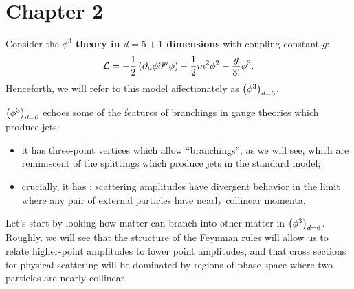 \section*{Chapter 2}

\begingroup
\renewcommand{\theequation}{\Alph{chapter}.\arabic{equation}}


\newcommand{\phicubedsix}{\ensuremath{\le(\phi^3\ri)_{d=6}}}


Consider the \textbf{\(\phi^3\) theory in \(d=5+1\) dimensions} with coupling constant \(g\):
\begin{align}
    \mathcal{L}
    =
    -\frac{1}{2}\left(\partial_\mu \phi \partial^\mu \phi\right)
    -
    \frac{1}{2}m^2 \phi^2
    -
    \frac{g}{3!}\phi^3
    .
\end{align}
Henceforth, we will refer to this model affectionately as \phicubedsix.

\phicubedsix{} echoes some of the features of branchings in gauge theories which produce jets:
\begin{itemize}
    \item
    it has three-point vertices which allow ``branchings'', as we will see, which are reminiscent of the splittings which produce jets in the standard model;

    \item
    crucially, it has :
    scattering amplitudes have divergent behavior in the limit where any pair of external particles have nearly collinear momenta.
\end{itemize}


Let's start by looking how matter can branch into other matter in \phicubedsix{}.
%
Roughly, we will see that the structure of the Feynman rules will allow us to relate higher-point amplitudes to lower point amplitudes, and that cross sections for physical scattering will be dominated by regions of phase space where two particles are nearly collinear.


